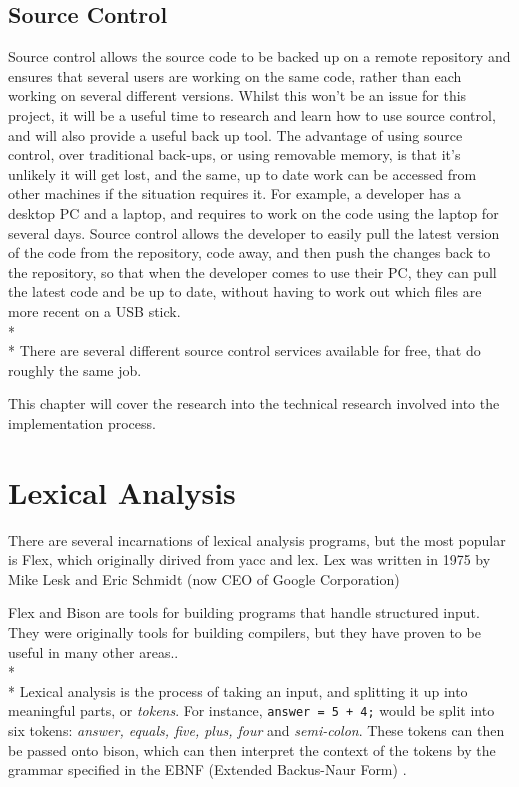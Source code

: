 \documentclass[12pt]{report}
\begin{document}
\subsection{Source Control}\label{subsec:dev_source_control}
Source control allows the source code to be backed up on a remote repository and ensures that several users are working on the same code, rather than each working on several different versions.  Whilst this won't be an issue for this project, it will be a useful time to research and learn how to use source control, and will also provide a useful back up tool.  The advantage of using source control, over traditional back-ups, or using removable memory, is that it's unlikely it will get lost, and the same, up to date work can be accessed from other machines if the situation requires it.  For example, a developer has a desktop PC and a laptop, and requires to work on the code using the laptop for several days.  Source control allows the developer to easily pull the latest version of the code from the repository, code away, and then push the changes back to the repository, so that when the developer comes to use their PC, they can pull the latest code and be up to date, without having to work out which files are more recent on a USB stick.
\\*
\\*
There are several different source control services available for free, that do roughly the same job.


This chapter will cover the research into the technical research involved into the implementation process.
\section{Lexical Analysis}\label{sec:lexical_analysis}
There are several incarnations of lexical analysis programs, but the most popular is Flex, which originally dirived from yacc and lex.  Lex was written in 1975 by Mike Lesk and Eric Schmidt (now CEO of Google Corporation)

Flex and Bison are tools for building programs that handle structured input.  They were originally tools for building compilers, but they have proven to be useful in many other areas.\citep{flexandbison09}.
\\*
\\*
Lexical analysis is the process of taking an input, and splitting it up into meaningful parts, or \textit{tokens}.  For instance, \texttt{answer = 5 + 4;} would be split into six tokens: \textit{answer, equals, five, plus, four} and \textit{semi-colon}.  These tokens can then be passed onto bison, which can then interpret the context of the tokens by the grammar specified in the EBNF (Extended Backus-Naur Form) .
\end{document}
